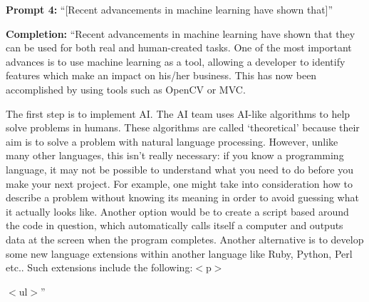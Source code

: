 \documentclass[12pt]{article}
\begin{document}
\begin{mdframed}[backgroundcolor=gray!10, roundcorner=5pt]
\raggedright
\textbf{Prompt 4:} ``[Recent advancements in machine learning have shown that]''

\textbf{Completion:} ``Recent advancements in machine learning have shown that they can be used for both real and human-created tasks. One of the most important advances is to use machine learning as a tool, allowing a developer to identify features which make an impact on his/her business. This has now been accomplished by using tools such as OpenCV or MVC.

The first step is to implement AI. The AI team uses AI-like algorithms to help solve problems in humans. These algorithms are called `theoretical' because their aim is to solve a problem with natural language processing. However, unlike many other languages, this isn't really necessary: if you know a programming language, it may not be possible to understand what you need to do before you make your next project. For example, one might take into consideration how to describe a problem without knowing its meaning in order to avoid guessing what it actually looks like. Another option would be to create a script based around the code in question, which automatically calls itself a computer and outputs data at the screen when the program completes. Another alternative is to develop some new language extensions within another language like Ruby, Python, Perl etc.. Such extensions include the following:$<$p$>$

$<$ul$>$''
\end{mdframed}
\end{document}

